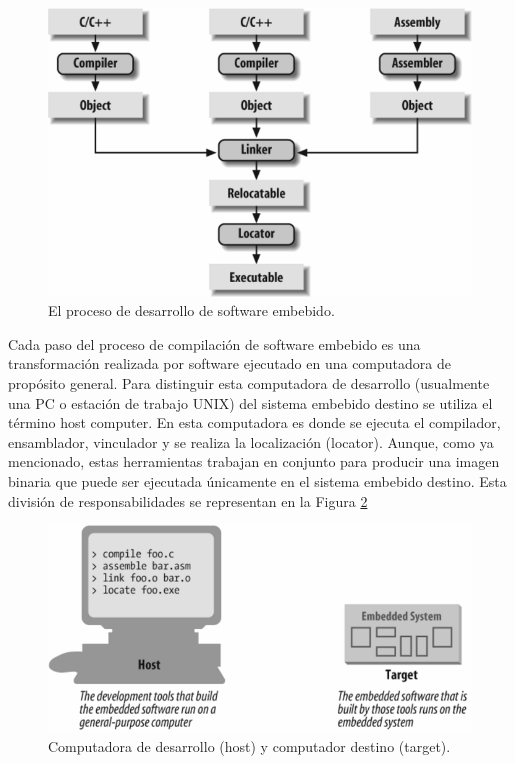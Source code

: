 \documentclass[12pt]{article}
\begin{document}
\begin{figure}
\includegraphics[width=\linewidth]{compilacion.png}
\caption{El proceso de desarrollo de software embebido.}
\label{fig:compilacion}
\end{figure}



Cada paso del proceso de compilación de software embebido
es una transformación realizada por software ejecutado en una computadora
de propósito general. Para distinguir esta computadora de desarrollo (usualmente una 
PC o estación de trabajo UNIX) del sistema embebido destino se utiliza el término host computer.
En esta computadora es donde se ejecuta el compilador, ensamblador, vinculador y se realiza la localización (locator).
Aunque, como ya mencionado, estas herramientas trabajan en conjunto
para producir una imagen binaria que puede ser ejecutada
únicamente en el sistema embebido destino. Esta división de responsabilidades
se representan en la Figura \ref{fig:compilacion2}

\begin{figure}
\includegraphics[width=\linewidth]{compilacion2.png}
\caption{Computadora de desarrollo (host) y computador destino (target).}
\label{fig:compilacion2}
\end{figure}
\end{document}
